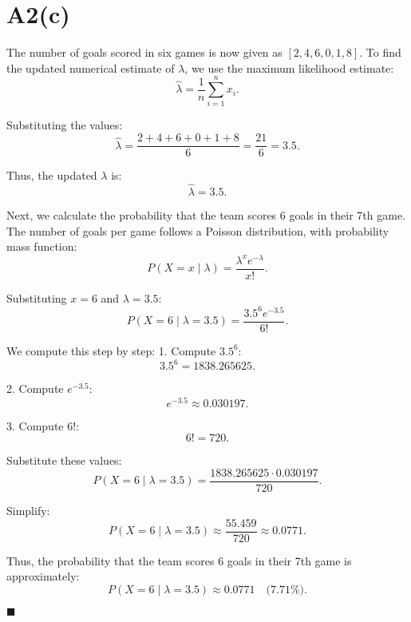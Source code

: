 \documentclass{article}
\begin{document}
\section*{A2(c)}

The number of goals scored in six games is now given as \( [2, 4, 6, 0, 1, 8] \). To find the updated numerical estimate of \( \lambda \), we use the maximum likelihood estimate:
\[
\hat{\lambda} = \frac{1}{n} \sum_{i=1}^n x_i.
\]

Substituting the values:
\[
\hat{\lambda} = \frac{2 + 4 + 6 + 0 + 1 + 8}{6} = \frac{21}{6} = 3.5.
\]

Thus, the updated \( \lambda \) is:
\[
\hat{\lambda} = 3.5.
\]

Next, we calculate the probability that the team scores 6 goals in their 7th game. The number of goals per game follows a Poisson distribution, with probability mass function:
\[
P(X = x \mid \lambda) = \frac{\lambda^x e^{-\lambda}}{x!}.
\]

Substituting \( x = 6 \) and \( \lambda = 3.5 \):
\[
P(X = 6 \mid \lambda = 3.5) = \frac{3.5^6 e^{-3.5}}{6!}.
\]

We compute this step by step:
1. Compute \( 3.5^6 \):
\[
3.5^6 = 1838.265625.
\]

2. Compute \( e^{-3.5} \):
\[
e^{-3.5} \approx 0.030197.
\]

3. Compute \( 6! \):
\[
6! = 720.
\]

Substitute these values:
\[
P(X = 6 \mid \lambda = 3.5) = \frac{1838.265625 \cdot 0.030197}{720}.
\]

Simplify:
\[
P(X = 6 \mid \lambda = 3.5) \approx \frac{55.459}{720} \approx 0.0771.
\]

Thus, the probability that the team scores 6 goals in their 7th game is approximately:
\[
P(X = 6 \mid \lambda = 3.5) \approx 0.0771 \quad \text{(7.71\%)}.
\]

\hfill\(\blacksquare\)
\end{document}
